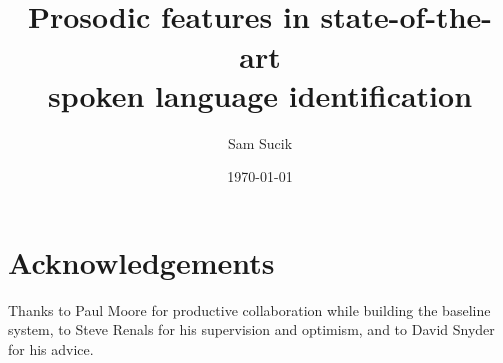 \documentclass[bsc,frontabs,twoside,singlespacing,parskip,deptreport]{infthesis}
\begin{document}
\title{\vspace{-5.0cm}  \vspace{1cm} \\ Prosodic features in state-of-the-art \\spoken language identification}

\author{Sam Sucik}

\project{\vspace{3cm}{\bf MInf Project (Part 1) Report}}

\date{\today}


\maketitle

\section*{Acknowledgements}{
  Thanks to Paul Moore for productive collaboration while building the baseline system, to Steve Renals for his supervision and optimism, and to David Snyder for his advice.
}

\tableofcontents
\end{document}
